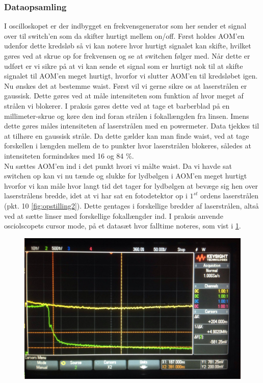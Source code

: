 \documentclass[main]{subfiles}
\begin{document}
\subsubsection{Dataopsamling}
I oscilloskopet er der indbygget en frekvensgenerator som her sender et signal over til switch'en som da skifter hurtigt mellem on/off. Først holdes AOM'en udenfor dette kredsløb så vi kan notere hvor hurtigt signalet kan skifte, hvilket gøres ved at skrue op for frekvensen og se at switchen følger med. Når dette er udført er vi sikre på at vi kan sende et signal som er hurtigt nok til at skifte signalet til AOM'en meget hurtigt, hvorfor vi slutter AOM'en til kredsløbet igen.
\\
Nu ønskes det at bestemme waist. Først vil vi gerne sikre os at laserstrålen er gaussisk. Dette gøres ved at måle intensiteten som funktion af hvor meget af strålen vi blokerer. I praksis gøres dette ved at tage et barberblad på en millimeter-skrue og køre den ind foran strålen i fokallængden fra linsen. Imens dette gøres måles intensiteten af laserstrålen med en powermeter. Data tjekkes til at tilhøre en gaussisk stråle. Da dette gælder kan man finde waist, ved at tage forskellen i længden mellem de to punkter hvor laserstrålen blokeres, således at  intensiteten formindskes med 16 og 84 \%.
\\ Nu sættes AOM'en ind i det punkt hvori vi målte waist. Da vi havde sat switchen op kan vi nu tænde og slukke for lydbølgen i AOM'en meget hurtigt hvorfor vi kan måle hvor langt tid det tager for lydbølgen at bevæge sig hen over laserstrålens bredde, idet at vi har sat en fotodetektor op i $1^{st}$ ordens laserstrålen (pkt. 10 \cref{fig:opstilling2}). Dette gentages i forskellige bredder af laserstrålen, altså ved at sætte linser med forskellige fokallængder ind. I praksis anvende osciolscopets cursor mode, på et datasæt hvor falltime noteres, som vist i  \cref{fig:osciolo}.
\begin{figure}[H]
    \includegraphics[width=\linewidth]{tegninger/osciolo.png}
    \caption{}
    \label{fig:osciolo}
\end{figure}
\end{document}
